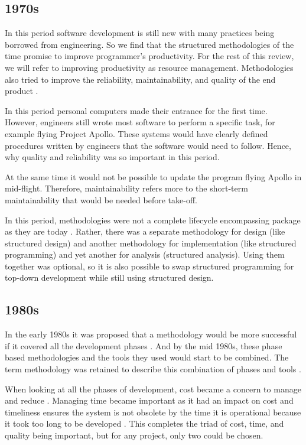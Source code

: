 \subsection{1970s}
In this period software development is still new with many practices being borrowed from engineering.
So we find that the structured methodologies of the time promise to improve programmer's productivity.
For the rest of this review, we will refer to improving productivity as resource management.
Methodologies also tried to improve the reliability, maintainability, and quality of the end product \cite{yourdon_1977}.

In this period personal computers made their entrance for the first time.
However, engineers still wrote most software to perform a specific task, for example flying Project Apollo.
These systems would have clearly defined procedures written by engineers that the software would need to follow.
Hence, why quality and reliability was so important in this period.

At the same time it would not be possible to update the program flying Apollo in mid-flight. 
Therefore, maintainability refers more to the short-term maintainability that would be needed before take-off.

In this period, methodologies were not a complete lifecycle encompassing package as they are today \cite{soi_1982, beregi_1985}.
Rather, there was a separate methodology for design (like structured design) and another methodology for implementation (like structured programming) and yet another for analysis (structured analysis).
Using them together was optional, so it is also possible to swap structured programming for top-down development while still using structured design. \cite{yourdon_1977}

\subsection{1980s}
In the early 1980s it was proposed that a methodology would be more successful if it covered all the development phases \cite{soi_1982}.
And by the mid 1980s, these phase based methodologies and the tools they used would start to be combined.
The term methodology was retained to describe this combination of phases and tools \cite{beregi_1985}. 

When looking at all the phases of development, cost became a concern to manage and reduce \cite{vanderlei_1983, peacham_1985, loesh_1985}.
Managing time became important as it had an impact on cost and timeliness ensures the system is not obsolete by the time it is operational because it took too long to be developed \cite{peacham_1985, beregi_1985, mannino_1987, paul_1993}. 
This completes the triad of cost, time, and quality being important, but for any project, only two could be chosen.

